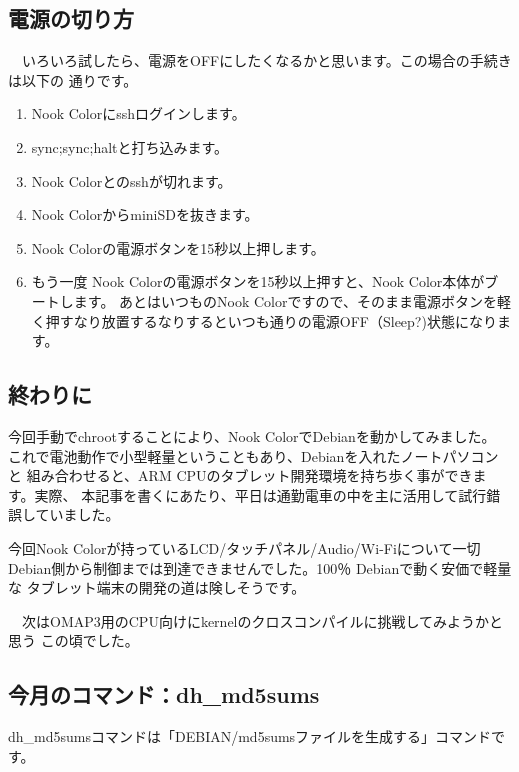 \documentclass[mingoth,a4paper]{jsarticle}
\begin{document}
\subsection{電源の切り方}

　いろいろ試したら、電源をOFFにしたくなるかと思います。この場合の手続きは以下の
通りです。

\begin{enumerate}
\item Nook Colorにsshログインします。
\item sync;sync;haltと打ち込みます。
\item Nook Colorとのsshが切れます。
\item Nook ColorからminiSDを抜きます。
\item Nook Colorの電源ボタンを15秒以上押します。
\item もう一度 Nook Colorの電源ボタンを15秒以上押すと、Nook Color本体がブートします。
あとはいつものNook Colorですので、そのまま電源ボタンを軽く押すなり放置するなりするといつも通りの電源OFF（Sleep?)状態になります。
\end{enumerate}

\subsection{終わりに}

 今回手動でchrootすることにより、Nook ColorでDebianを動かしてみました。
これで電池動作で小型軽量ということもあり、Debianを入れたノートパソコンと
組み合わせると、ARM CPUのタブレット開発環境を持ち歩く事ができます。実際、
本記事を書くにあたり、平日は通勤電車の中を主に活用して試行錯誤していました。

 今回Nook Colorが持っているLCD/タッチパネル/Audio/Wi-Fiについて一切
Debian側から制御までは到達できませんでした。100％ Debianで動く安価で軽量な
タブレット端末の開発の道は険しそうです。

　次はOMAP3用のCPU向けにkernelのクロスコンパイルに挑戦してみようかと思う
この頃でした。


\subsection{今月のコマンド：dh\_md5sums}
dh\_md5sumsコマンドは「DEBIAN/md5sumsファイルを生成する」コマンドです。
\end{document}
